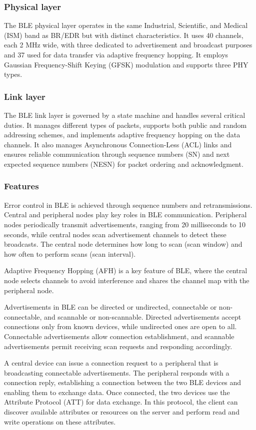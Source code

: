 \subsubsection{Physical layer}
The BLE physical layer operates in the same Industrial, Scientific, and Medical (ISM) band as BR/EDR but with distinct characteristics. 
It uses 40 channels, each 2 MHz wide, with three dedicated to advertisement and broadcast purposes and 37 used for data transfer via adaptive frequency hopping. 
It employs Gaussian Frequency-Shift Keying (GFSK) modulation and supports three PHY types.

\subsubsection{Link layer}
The BLE link layer is governed by a state machine and handles several critical duties. 
It manages different types of packets, supports both public and random addressing schemes, and implements adaptive frequency hopping on the data channels. 
It also manages Asynchronous Connection-Less (ACL) links and ensures reliable communication through sequence numbers (SN) and next expected sequence numbers (NESN) for packet ordering and acknowledgment.

\subsubsection{Features}
Error control in BLE is achieved through sequence numbers and retransmissions. 
Central and peripheral nodes play key roles in BLE communication.
Peripheral nodes periodically transmit advertisements, ranging from 20 milliseconds to 10 seconds, while central nodes scan advertisement channels to detect these broadcasts. 
The central node determines how long to scan (scan window) and how often to perform scans (scan interval).

Adaptive Frequency Hopping (AFH) is a key feature of BLE, where the central node selects channels to avoid interference and shares the channel map with the peripheral node. 

Advertisements in BLE can be directed or undirected, connectable or non-connectable, and scannable or non-scannable. 
Directed advertisements accept connections only from known devices, while undirected ones are open to all. 
Connectable advertisements allow connection establishment, and scannable advertisements permit receiving scan requests and responding accordingly.

A central device can issue a connection request to a peripheral that is broadcasting connectable advertisements. 
The peripheral responds with a connection reply, establishing a connection between the two BLE devices and enabling them to exchange data. 
Once connected, the two devices use the Attribute Protocol (ATT) for data exchange. 
In this protocol, the client can discover available attributes or resources on the server and perform read and write operations on these attributes.